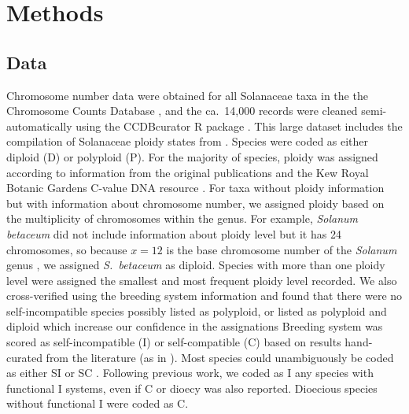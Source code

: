 \section{Methods}

\subsection{Data}

Chromosome number data were obtained for all Solanaceae taxa in the the Chromosome Counts Database \citep[CCDB;][]{rice_2015}, and the ca.\ 14,000 records were cleaned semi-automatically using the CCDBcurator R package \citep{rivero_2019}. 
This large dataset includes the compilation of Solanaceae ploidy states from \citep{robertson_2011}.
Species were coded as either diploid (D) or polyploid (P).
For the majority of species, ploidy was assigned according to information from the original publications and the Kew Royal Botanic Gardens C-value DNA resource \citep{bennett_2005}.
For taxa without ploidy information but with information about chromosome number, we assigned ploidy based on the multiplicity of chromosomes within the genus.
For example, \textit{Solanum betaceum} did not include information about ploidy level but it has 24 chromosomes, so because $x=12$ is the base chromosome number of the \textit{Solanum} genus \citep{olmstead_2007}, we assigned \textit{S.~betaceum} as diploid. 
Species with more than one ploidy level were assigned the smallest and most frequent ploidy level recorded.  We also cross-verified using the breeding system information and found that there were no self-incompatible species possibly listed as polyploid, or listed as polyploid and diploid which increase our confidence in the assignations%
Breeding system was scored as self-incompatible (I) or self-compatible (C) based on results hand-curated from the literature (as in \citealt{igic_2006, goldberg_2010, robertson_2011, goldberg_2012}).
Most species could unambiguously be coded as either SI or SC \citep{raduski_2012}.
Following previous work, we coded as I any species with functional I systems, even if C or dioecy was also reported.
Dioecious species without functional I were coded as C.

